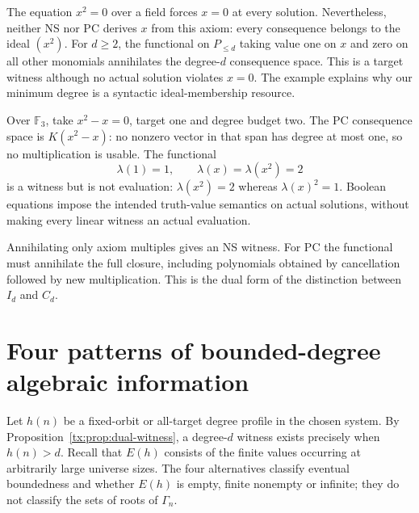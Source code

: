 \begin{example}
The equation $x^2=0$ over a field forces $x=0$ at every solution.
Nevertheless, neither NS nor PC derives $x$ from this axiom: every
consequence belongs to the ideal $(x^2)$. For $d\ge2$, the functional
on $P_{\le d}$ taking value one on $x$ and zero on all other monomials
annihilates the degree-$d$ consequence space. This is a target witness
although no actual solution violates $x=0$. The example explains why
our minimum degree is a syntactic ideal-membership resource.
\end{example}

\begin{example}
Over $\mathbb F_3$, take $x^2-x=0$, target one and degree budget two.
The PC consequence space is $K(x^2-x)$: no nonzero vector in that span
has degree at most one, so no multiplication is usable. The functional
\[
 \lambda(1)=1,\qquad\lambda(x)=\lambda(x^2)=2
\]
is a witness but is not evaluation: $\lambda(x^2)=2$ whereas
$\lambda(x)^2=1$. Boolean equations impose the intended truth-value
semantics on actual solutions, without making every linear witness an
actual evaluation.
\end{example}

Annihilating only axiom multiples gives an NS witness. For PC the
functional must annihilate the full closure, including polynomials
obtained by cancellation followed by new multiplication. This is the
dual form of the distinction between $I_d$ and $C_d$.

\section{Four patterns of bounded-degree algebraic information}
Let $h(n)$ be a fixed-orbit or all-target degree profile in the chosen
system. By Proposition~\ref{tx:prop:dual-witness}, a degree-$d$ witness
exists precisely when $h(n)>d$.
Recall that $E(h)$ consists of the finite values occurring at arbitrarily
large universe sizes. The four alternatives classify eventual boundedness and
whether $E(h)$ is empty, finite nonempty or infinite; they do not classify
the sets of roots of $\Gamma_n$.

